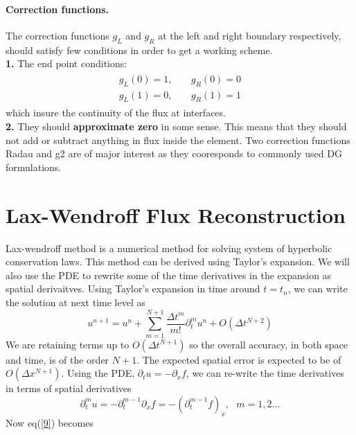 \paragraph{Correction functions.} The correction functions $g_L$ and $g_R$ at the left and right boundary respectively, should satisfy few conditions in order to get a working scheme.\\
\textbf{1.} The end point conditions:
\begin{align*}
    \begin{split}
        g_L(0) = 1,&~~~~~g_R(0) = 0\\
        g_L(1) = 0,&~~~~~g_R(1) = 1
    \end{split}
\end{align*}
which insure the continuity of the flux at interfaces.\\
\textbf{2.} They should \textbf{approximate zero} in some sense. This means that they should not add or subtract anything in flux inside the element. 
Two correction functions Radau and g2 are of major interest as they cooresponds to commonly used DG formulations.

\section[LWFR]{Lax-Wendroff Flux Reconstruction}
Lax-wendroff method is a numerical method for solving system of hyperbolic conservation laws. This method can be derived using Taylor's expansion. We will also use the PDE to rewrite some of the time derivatives in the expansion as spatial derivaitves. Using Taylor's expansion in time around $t = t_n$, we can write the solution at next time level as
\begin{equation} \label{9}
    u^{n+1} = u^n + \sum\limits_{m=1}^{N+1} \frac{\Delta t^m}{m!}\partial_t^mu^n + O(\Delta t^{N+2})
\end{equation}
We are retaining terms up to $O(\Delta t^{N+1})$ so the overall accuracy, in both space and time, is of the order $N+1$. The expected spatial error is expected to be of $O(\Delta x^{N+1})$.
Using the PDE, $ \partial_t u = -\partial_x f$, we can re-write the time derivatives in terms of spatial derivatives
\begin{equation*}
    \partial_t^m u = -\partial_t^{m-1} \partial_xf = -(\partial_t^{m-1}f)_x, \hspace{8pt} m = 1,2 \dots
\end{equation*}
Now eq(\ref{9}) becomes


